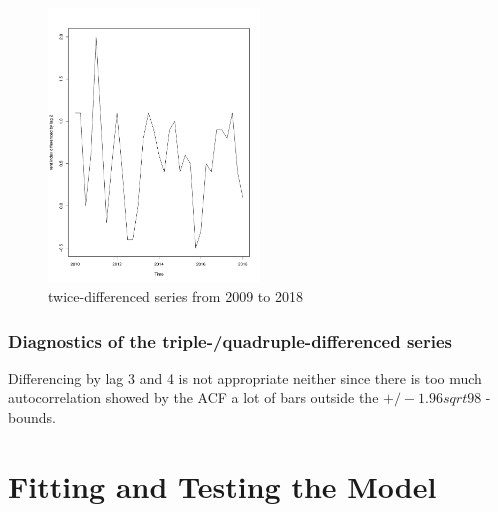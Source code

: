 \documentclass[11pt,a4paper]{article}
\begin{document}
\begin{figure}
\centering
\includegraphics[angle=0,
width=0.5\textwidth]{diff2_testset}
\caption{twice-differenced series from 2009 to 2018
\label{fig:diff2_testset}}
\end{figure} 

\subsubsection{Diagnostics of the triple-/quadruple-differenced series}
Differencing by lag 3 and 4 is not appropriate neither since there is too much autocorrelation showed by the ACF a lot of bars outside the $+/-1.96sqrt{98}$ - bounds.


\section{Fitting and Testing the Model}
\end{document}
